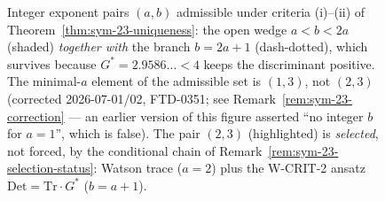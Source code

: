 \documentclass[11pt]{article}
\theoremstyle{definition}
\theoremstyle{remark}
\newcommand{\Gs}{G^{*}}
\begin{document}
\begin{figure}[ht]
\begin{tikzpicture}
\end{tikzpicture}
\caption{Integer exponent pairs $(a, b)$ admissible under criteria
(i)--(ii) of Theorem~\ref{thm:sym-23-uniqueness}: the open wedge
$a < b < 2a$ (shaded) \emph{together with} the branch $b = 2a + 1$
(dash-dotted), which survives because $\Gs = 2.9586\ldots < 4$ keeps
the discriminant positive. The minimal-$a$ element of the admissible
set is $(1, 3)$, not $(2, 3)$ (corrected 2026-07-01/02, FTD-0351;
see Remark~\ref{rem:sym-23-correction} --- an earlier version of this
figure asserted ``no integer $b$ for $a = 1$'', which is false). The
pair $(2, 3)$ (highlighted) is \emph{selected}, not forced, by the
conditional chain of Remark~\ref{rem:sym-23-selection-status}:
Watson trace ($a = 2$) plus the W-CRIT-2 ansatz
$\mathrm{Det} = \mathrm{Tr}\cdot\Gs$ ($b = a + 1$).}\label{fig:exponent-lattice}
\end{figure}
\end{document}
